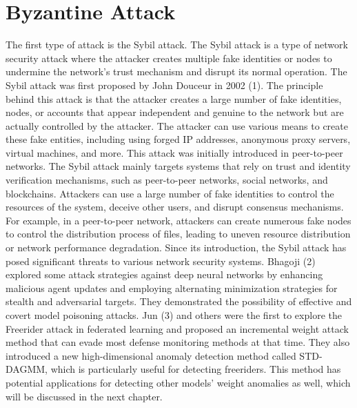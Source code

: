 \documentclass[conference]{IEEEtran}
\begin{document}
\section{Byzantine Attack}
The first type of attack is the Sybil attack. The Sybil attack is a type of network security attack where the attacker creates multiple fake identities or nodes to undermine the network's trust mechanism and disrupt its normal operation.
The Sybil attack was first proposed by John Douceur in 2002 (1). The principle behind this attack is that the attacker creates a large number of fake identities, nodes, or accounts that appear independent and genuine to the network but are actually controlled by the attacker. The attacker can use various means to create these fake entities, including using forged IP addresses, anonymous proxy servers, virtual machines, and more. This attack was initially introduced in peer-to-peer networks. The Sybil attack mainly targets systems that rely on trust and identity verification mechanisms, such as peer-to-peer networks, social networks, and blockchains. Attackers can use a large number of fake identities to control the resources of the system, deceive other users, and disrupt consensus mechanisms. For example, in a peer-to-peer network, attackers can create numerous fake nodes to control the distribution process of files, leading to uneven resource distribution or network performance degradation.
Since its introduction, the Sybil attack has posed significant threats to various network security systems. Bhagoji (2) explored some attack strategies against deep neural networks by enhancing malicious agent updates and employing alternating minimization strategies for stealth and adversarial targets. They demonstrated the possibility of effective and covert model poisoning attacks. Jun (3) and others were the first to explore the Freerider attack in federated learning and proposed an incremental weight attack method that can evade most defense monitoring methods at that time. They also introduced a new high-dimensional anomaly detection method called STD-DAGMM, which is particularly useful for detecting freeriders. This method has potential applications for detecting other models' weight anomalies as well, which will be discussed in the next chapter.
\end{document}
